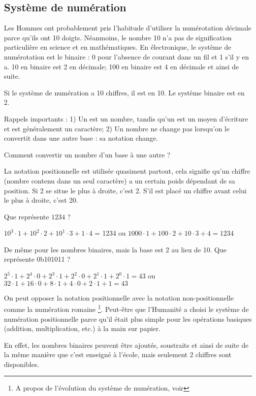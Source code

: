 \subsection{Système de numération}

Les Hommes ont probablement pris l'habitude d'utiliser la numérotation décimale parce qu'ils ont 10 doigts.
Néanmoins, le nombre 10 n'a pas de signification particulière en science et en mathématiques.
En électronique, le système de numérotation est le binaire : 0 pour l'absence de courant dans un fil et 1 s'il y en a.
10 en binaire est 2 en décimale; 100 en binaire est 4 en décimale et ainsi de suite.

Si le système de numération a 10 chiffres, il est en  10. %
Le système binaire est en  2.

Rappels importants :
1) Un  est un nombre, tandis qu'un  est un moyen d'écriture et est généralement un caractère;
2) Un nombre ne change pas lorsqu'on le convertit dans une autre base : sa notation change.

Comment convertir un nombre d'un base à une autre ?

La notation positionnelle est utilisée quasiment partout, cela signifie qu'un chiffre (nombre contenu dans un seul caractère) a un certain poids dépendant de sa position.
Si 2 se situe le plus à droite, c'est 2.
S'il est placé un chiffre avant celui le plus à droite, c'est 20.

Que représente $1234$ ?

$10^3 \cdot 1 + 10^2 \cdot 2 + 10^1 \cdot 3 + 1 \cdot 4$ = 1234 ou 
$1000 \cdot 1 + 100 \cdot 2 + 10 \cdot 3 + 4 = 1234$

De même pour les nombres binaires, mais la base est 2 au lieu de 10.
Que représente 0b101011 ?

$2^5 \cdot 1 + 2^4 \cdot 0 + 2^3 \cdot 1 + 2^2 \cdot 0 + 2^1 \cdot 1 + 2^0 \cdot 1 = 43$ ou
$32 \cdot 1 + 16 \cdot 0 + 8 \cdot 1 + 4 \cdot 0 + 2 \cdot 1 + 1 = 43$

On peut opposer la notation positionnelle avec la notation non-positionnelle comme la numération romaine
\footnote{A propos de l'évolution du système de numération, voir }.
Peut-être que l'Humanité a choisi le système de numération positionnelle parce qu'il était plus simple pour les opérations basiques (addition, multiplication, etc.) à la main sur papier.

En effet, les nombres binaires peuvent être ajoutés, soustraits et ainsi de suite de la même manière que c'est enseigné à l'école, mais seulement 2 chiffres sont disponibles.

